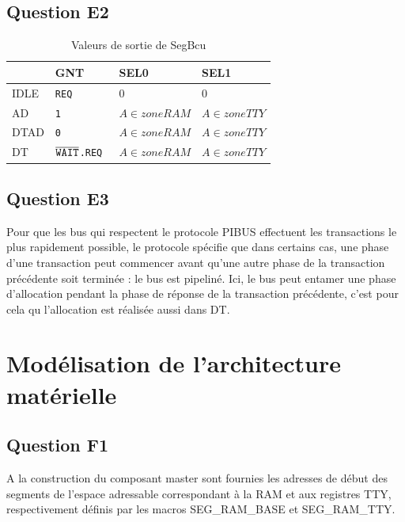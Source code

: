 \documentclass{article}
\begin{document}
\subsection{Question E2}

\begin{table}[H]
\centering
\begingroup
\setlength{\tabcolsep}{5pt}
\renewcommand{\arraystretch}{1.1}
\begin{tabular}{|l|l|l|l|}
\hline
        & GNT             & SEL0               & SEL1            \\
\hline
IDLE    & \tt{REQ}        & 0                  & 0               \\
AD      & \tt{1}          & $A \in zoneRAM$    & $A \in zoneTTY$ \\
DTAD    & \tt{0}          & $A \in zoneRAM$    & $A \in zoneTTY$ \\
DT      & \tt{$\overline{\tt{WAIT}}$.REQ}   & $A \in zoneRAM$    & $A \in zoneTTY$ \\
\hline
\end{tabular}
\endgroup
\caption{Valeurs de sortie de SegBcu}
\end{table}

\subsection{Question E3}

Pour que les bus qui respectent le protocole PIBUS effectuent les transactions le plus
rapidement possible, le protocole spécifie que dans certains cas, une phase d'une transaction
peut commencer avant qu'une autre phase de la transaction précédente soit terminée :
le bus est pipeliné. Ici, le bus peut entamer une phase d'allocation pendant la phase de
réponse de la transaction précédente, c'est pour cela qu l'allocation est réalisée aussi dans DT.


\section{Modélisation de l'architecture matérielle}

\subsection{Question F1}

A la construction du composant master sont fournies les adresses
de début des segments de l'espace adressable correspondant à la RAM et
aux registres TTY, respectivement définis par les macros SEG\_RAM\_BASE
et SEG\_RAM\_TTY.
\end{document}
